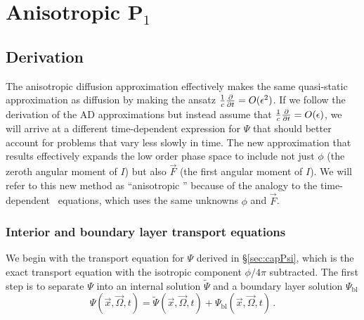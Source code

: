 
\chapter{Anisotropic P$_1$}\label{chap:aponeDerivation}

\section{Derivation}

The anisotropic diffusion approximation effectively makes the same quasi-static
approximation as diffusion by making the ansatz
$\frac1c\frac{\partial }{\partial t}=O(\epsilon^2)$. If we follow the derivation of the AD
approximations but instead assume that $\frac1c\frac{\partial }{\partial t}=O(\epsilon)$, we will
arrive at a different time-dependent expression for $\Psi$ that
should better account for problems that vary less slowly in time.
The new approximation that results effectively expands the low order phase
space to include not just $\phi$ (the zeroth angular moment of $I$) but also
$\vec{F}$ (the first angular moment of $I$). We will refer to this new method
as ``anisotropic \Pone'' because of the analogy to the time-dependent \Pone\
equations, which uses the same unknowns $\phi$ and $\vec{F}$.

\subsection{Interior and boundary layer transport equations}

We begin with the transport equation for $\Psi$ derived in \S\ref{sec:capPsi},
which is the exact transport equation with the isotropic component $\phi/4\pi$
subtracted. 
The first step is to separate $\Psi$ into an internal solution $\tilde\Psi$ and
a boundary layer solution
$\Psi_\mathrm{bl}$
\begin{equation} \label{eq:ap1boundaryLayerPsi}
  \Psi(\vec{x}, \vec{\Omega}, t)
  = \tilde\Psi(\vec{x}, \vec{\Omega}, t)
  + \Psi_\mathrm{bl}(\vec{x}, \vec{\Omega}, t)\,.
\end{equation}

